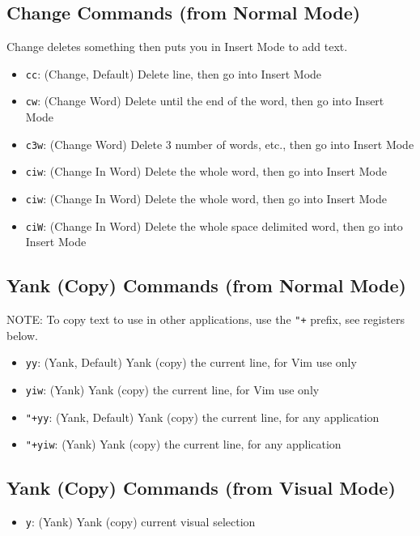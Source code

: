 \documentclass[11pt]{article}
\begin{document}
\subsection{Change Commands (from Normal Mode)}
\label{sec:org2142d7b}
Change deletes something then puts you in Insert Mode
to add text.

\begin{itemize}
\item \texttt{cc}: (Change, Default) Delete line, then go into Insert Mode
\item \texttt{cw}: (Change Word) Delete until the end of the word, then go into Insert Mode
\item \texttt{c3w}: (Change Word) Delete 3 number of words, etc., then go into Insert Mode
\item \texttt{ciw}: (Change In Word) Delete the whole word, then go into Insert Mode
\item \texttt{ciw}: (Change In Word) Delete the whole word, then go into Insert Mode
\item \texttt{ciW}: (Change In Word) Delete the whole space delimited word, then go into Insert Mode
\end{itemize}

\subsection{Yank (Copy) Commands (from Normal Mode)}
\label{sec:orgceeba1c}
NOTE: To copy text to use in other applications, use the \texttt{"+} prefix, see
registers below.

\begin{itemize}
\item \texttt{yy}: (Yank, Default) Yank (copy) the current line, for Vim use only
\item \texttt{yiw}: (Yank) Yank (copy) the current line, for Vim use only

\item \texttt{"+yy}: (Yank, Default) Yank (copy) the current line, for any application
\item \texttt{"+yiw}: (Yank) Yank (copy) the current line, for any application
\end{itemize}
\subsection{Yank (Copy) Commands (from Visual Mode)}
\label{sec:org5127427}
\begin{itemize}
\item \texttt{y}: (Yank) Yank (copy) current visual selection
\end{itemize}
\end{document}
